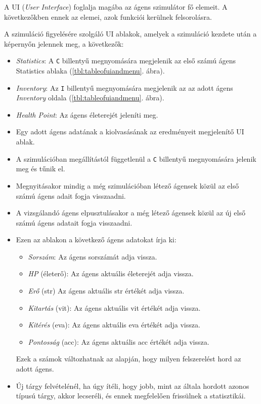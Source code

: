 \label{UI}

A UI (\textit{User Interface}) foglalja magába az ágens szimulátor fő elemeit. A következőkben ennek az elemei, azok funkciói kerülnek felsorolásra.

\medskip

\noindent A szimuláció figyelésére szolgáló UI ablakok, amelyek a szimuláció kezdete után a képernyőn jelennek meg, a következők:

\begin{itemize}
    \item \textit{Statistics}: A \texttt{C} billentyű megnyomására megjelenik az első számú ágens Statistics ablaka (\ref{tbl:tableofuiandmenu}. ábra).
    \item \textit{Inventory}: Az \texttt{I} billentyű megnyomására megjelenik az az adott ágens \textit{Inventory} oldala (\ref{tbl:tableofuiandmenu}. ábra).
    \item \textit{Health Point}: Az ágens életerejét jeleníti meg.
\end{itemize}


\begin{itemize}
    \item Egy adott ágens adatának a kiolvasásának az eredményeit megjelenítő UI ablak. 
    \item A szimulációban megállítástól függetlenül a \texttt{C} billentyű megnyomására jelenik meg és tűnik el.
    \item Megnyitásakor mindig a még szimulációban létező ágensek közül az első számú ágens adait fogja visszaadni.
    \item A vizsgálandó ágens elpusztulásakor a még létező ágensek közül az új első számú ágens adatait fogja visszaadni.
    \item Ezen az ablakon a következő ágens adatokat írja ki:
    \begin{itemize}
    \item \textit{Sorszám}: Az ágens sorszámát adja vissza.
    \item \textit{HP} (életerő): Az ágens aktuális életerejét adja vissza.
    \item \textit{Erő} (str) Az ágens aktuális str értékét adja vissza.
    \item \textit{Kitartás} (vit): Az ágens aktuális vit értékét adja vissza.
    \item \textit{Kitérés} (eva): Az ágens aktuális eva értékét adja vissza.
    \item \textit{Pontosság} (acc): Az ágens aktuális acc értékét adja vissza.
    \end{itemize}
    Ezek a számok változhatnak az alapján, hogy milyen felszerelést hord az adott ágens.
    \item Új tárgy felvételénél, ha úgy ítéli, hogy jobb, mint az általa hordott azonos típusú tárgy, akkor lecseréli, és ennek megfelelően frissülnek a statisztikái.
\end{itemize}

